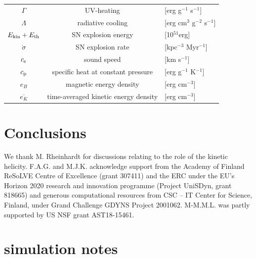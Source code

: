 \documentclass[preprint2]{aastex63}
\newcommand\ESK{E_{\rm kin}}
\newcommand\EST{E_{\rm th}}
\begin{document}
\begin{table}[h]
\begin{tabular}{ccl}
 $\Gamma$ & UV-heating& [erg g$^{-1}$ s$^{-1}$]\\
 $\Lambda$ & radiative cooling& [erg cm$^{3}$ g$^{-2}$ s$^{-1}$]\\
 $\ESK+\EST$ & SN explosion energy& [10$^{51}$erg]\\
 $\dot\sigma$ & SN explosion rate & [kpc$^{-3}$ Myr$^{-1}$]\\
 $c_{\rm s}$ & sound speed & [km s$^{-1}$]\\
 $c_{\rm p}$ & specific heat at constant pressure & [erg g$^{-1}$ K$^{-1}$]\\
 $e_B$ & magnetic energy density & [erg cm$^{-3}$]\\
 $\overline{e_K}$ & time-averaged kinetic energy density & [erg cm$^{-3}$]\\
\hline
\end{tabular}
\end{table}


\section{Conclusions}\label{sec:conc}

\acknowledgments
 {We thank M. Rheinhardt for discussions relating to the role of 
 the kinetic helicity.}
 F.A.G. and M.J.K. acknowledge support from the Academy of Finland
 ReSoLVE Centre of Excellence (grant 307411) and the ERC
 under the EU's Horizon 2020 research and innovation
 programme (Project UniSDyn, grant 818665) and generous computational
 resources from CSC -- IT Center for Science, Finland, under Grand
 Challenge GDYNS Project 2001062. 
 M-M.M.L. was partly supported by US NSF grant AST18-15461.


\newpage

{}
\section*{simulation notes}
\end{document}
